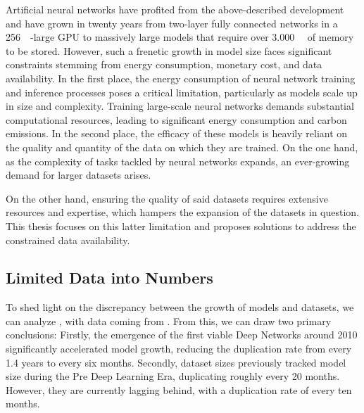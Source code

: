 Artificial neural networks have profited from the above-described development and have grown in twenty years from two-layer fully connected networks in a \qty{256}{\mega\byte}-large GPU to massively large models that require over \qty{3,000}{\giga\byte} of memory to be stored. However, such a frenetic growth in model size faces significant constraints stemming from energy consumption, monetary cost, and data availability. In the first place, the energy consumption of neural network training and inference processes poses a critical limitation, particularly as models scale up in size and complexity. Training large-scale neural networks demands substantial computational resources, leading to significant energy consumption and carbon emissions. In the second place, the efficacy of these models is heavily reliant on the quality and quantity of the data on which they are trained. On the one hand, as the complexity of tasks tackled by neural networks expands, an ever-growing demand for larger datasets arises.

On the other hand, ensuring the quality of said datasets requires extensive resources and expertise, which hampers the expansion of the datasets in question. This thesis focuses on this latter limitation and proposes solutions to address the constrained data availability.

\subsection{Limited Data into Numbers}
To shed light on the discrepancy between the growth of models and datasets, we can analyze , with data coming from . From this, we can draw two primary conclusions: Firstly, the emergence of the first viable Deep Networks around 2010 significantly accelerated model growth, reducing the duplication rate from every 1.4 years to every six months. Secondly, dataset sizes previously tracked model size during the Pre Deep Learning Era, duplicating roughly every 20 months. However, they are currently lagging behind, with a duplication rate of every ten months. %

